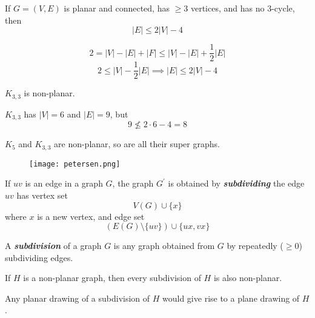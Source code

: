 \begin{Corollary}{}{}
    If $ G=(V,E) $ is planar and connected,
    has $ \geqslant 3 $ vertices, and has no
    $ 3 $-cycle, then
    \[ |E|\leqslant 2|V|-4 \]
\end{Corollary}

\begin{Proof}{}{}
    \[ 2=|V|-|E|+|F|\leqslant |V|-|E|+\frac{1}{2} |E| \]
    \[ 2\leqslant |V|-\frac{1}{2} |E|\implies |E|\leqslant 2|V|-4 \]
\end{Proof}


\begin{Corollary}{}{}
    $ K_{3,3} $ is non-planar.
\end{Corollary}

\begin{Proof}{}{}
    $ K_{3,3} $ has $ |V|=6 $ and $ |E|=9 $, but
    \[ 9\nleqslant 2\cdot 6-4=8 \]
\end{Proof}

$ K_5 $ and $ K_{3,3} $ are non-planar, so are all their super graphs.

\begin{figure}[H]
    \centering
    \texttt{[image: petersen.png]}
\end{figure}


\begin{Definition}{}{}
    If $ uv $ is an edge in a graph $ G $, the graph $ G^{\prime} $
    is obtained by \textbf{\emph{subdividing}} the edge $ uv $
    has vertex set
    \[ V(G)\cup \{x\} \]
    where $ x $ is a new vertex, and edge set
    \[ (E(G)\setminus \{uv\})\cup \{ux,vx\} \]
\end{Definition}



\begin{Definition}{}{}
    A \textbf{\emph{subdivision}} of a graph $ G $ is any graph
    obtained from $ G $ by repeatedly ($ \geqslant 0 $) subdividing edges.
\end{Definition}



\begin{Proposition}{}{}
    If $ H $ is a non-planar graph, then every subdivision of $ H $
    is also non-planar.
\end{Proposition}

\begin{Proof}{}{}
    Any planar drawing of a subdivision of $ H $ would give rise to
    a plane drawing of $ H $.
\end{Proof}


